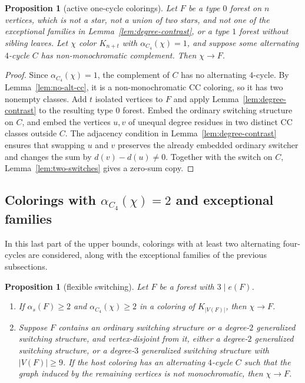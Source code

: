 \documentclass[11pt]{article}
\newtheorem{proposition}[theorem]{Proposition}
\newcommand{\as}{\alpha_s}
\newcommand{\ac}{\alpha_{C_4}}
\begin{document}
\begin{proposition}[active one-cycle colorings]\label{prop:active-one-cycle}
Let $F$ be a type $0$ forest on $n$ vertices, which is not a star, not a union of two stars, and not one of the exceptional families in Lemma~\ref{lem:degree-contrast}, or a type $1$ forest without sibling leaves.  Let $\chi$ color $K_{n+t}$ with $\ac(\chi)=1$, and suppose some alternating $4$-cycle $C$ has non-monochromatic complement.  Then $\chi\to F$.
\end{proposition}

\begin{proof}
Since $\ac(\chi)=1$, the complement of $C$ has no alternating $4$-cycle.  By Lemma~\ref{lem:no-alt-cc}, it is a non-monochromatic CC coloring, so it has two nonempty classes.  Add $t$ isolated vertices to $F$ and apply Lemma~\ref{lem:degree-contrast} to the resulting type $0$ forest.  Embed the ordinary switching structure on $C$, and embed the vertices $u,v$ of unequal degree residues in two distinct CC classes outside $C$.  The adjacency condition in Lemma~\ref{lem:degree-contrast} ensures that swapping $u$ and $v$ preserves the already embedded ordinary switcher and changes the sum by $d(v)-d(u)\ne0$.  Together with the switch on $C$, Lemma~\ref{lem:two-switches} gives a zero-sum copy.
\end{proof}

\subsection{Colorings with $\alpha_{C_4}(\chi)=2$ and exceptional families}

In this last part of the upper bounds, colorings with at least two alternating four-cycles are considered, along with the exceptional families of the previous subsections.

\begin{proposition}[flexible switching]\label{prop:flexible}\label{prop:generalizedswitchings}
Let $F$ be a forest with $3\mid e(F)$.
\begin{enumerate}[label=(\alph*),leftmargin=2.2em]
\item If $\as(F)\ge2$ and $\ac(\chi)\ge2$ in a coloring of $K_{|V(F)|}$, then $\chi\to F$.
\item Suppose $F$ contains an ordinary switching structure or a degree-$2$ generalized switching structure, and vertex-disjoint from it, either a degree-$2$ generalized switching structure, or a degree-$3$ generalized switching structure with $|V(F)|\ge9$.  If the host coloring has an alternating $4$-cycle $C$ such that the graph induced by the remaining vertices is not monochromatic, then $\chi\to F$.

\end{enumerate}
\end{proposition}
\end{document}
